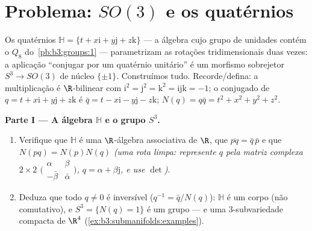 \section{Problema: \texorpdfstring{$SO(3)$}{SO(3)} e os
quatérnios}

\begin{problem}\label{pb:b3:submanifolds:1}
Os quatérnios $\mathbb H = \{t + x\mathrm i + y\mathrm j +
z\mathrm k\}$ --- a álgebra cujo grupo de unidades contém o
$Q_8$ do~\cref{pb:b3:groups:1} --- parametrizam as rotações
tridimensionais duas vezes: a aplicação ``conjugar por um quatérnio
unitário'' é um morfismo sobrejetor $S^3 \to
SO(3)$ de núcleo $\{\pm1\}$. Construímos
tudo. Recorde/defina: a multiplicação é $\R$-bilinear com $\mathrm i^2 = \mathrm j^2 = \mathrm k^2 =
\mathrm{ijk} = -1$; o
conjugado de $q = t + x\mathrm i +
y\mathrm j + z\mathrm k$ é $\bar q = t - x\mathrm i -
y\mathrm j - z\mathrm k$; $N(q) = q\bar q = t^2 + x^2 + y^2
+ z^2$.

\medskip
\noindent\textbf{Parte I --- A álgebra $\mathbb H$ e o grupo $S^3$.}
\begin{enumerate}
  \item Verifique que $\mathbb H$ é uma $\R$-álgebra associativa de 
        $\R$, que $\overline{pq} =
        \bar q\,\bar p$ e que $N(pq) = N(p)N(q)$ \emph{(uma rota limpa:
        represente $q$ pela matriz complexa $2\times2$ $\bigl(\begin{smallmatrix}\alpha & \beta\\
        -\bar\beta & \bar\alpha\end{smallmatrix}\bigr)$, $q =
        \alpha + \beta\mathrm j$, e use
        $\det$)}.
  \item Deduza que todo $q \neq 0$ é inversível ($q^{-1} =
        \bar q/N(q)$): $\mathbb H$ é um corpo (não
        comutativo), e $S^3 = \{N(q) = 1\}$ é um grupo --- e uma $3$-subvariedade
        compacta de $\R^4$ (\cref{ex:b3:submanifolds:examples}).
\end{enumerate}


\end{problem}
